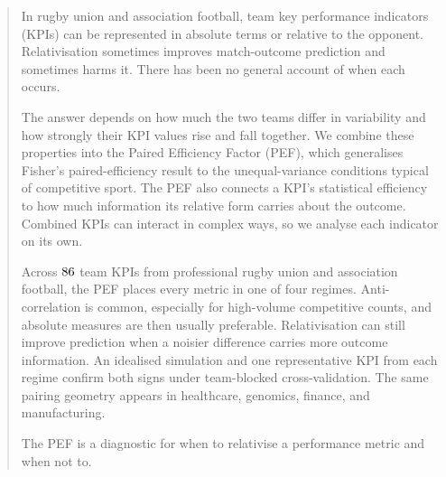 \begin{abstract}
In rugby union and association football, team key performance indicators (KPIs) can be represented in absolute terms or relative to the opponent. Relativisation sometimes improves match-outcome prediction and sometimes harms it. There has been no general account of when each occurs.

The answer depends on how much the two teams differ in variability and how strongly their KPI values rise and fall together. We combine these properties into the Paired Efficiency Factor (PEF), which generalises Fisher's paired-efficiency result to the unequal-variance conditions typical of competitive sport. The PEF also connects a KPI's statistical efficiency to how much information its relative form carries about the outcome. Combined KPIs can interact in complex ways, so we analyse each indicator on its own.

Across $\PEFtotalStudies$ team KPIs from professional rugby union and association football, the PEF places every metric in one of four regimes. Anti-correlation is common, especially for high-volume competitive counts, and absolute measures are then usually preferable. Relativisation can still improve prediction when a noisier difference carries more outcome information. An idealised simulation and one representative KPI from each regime confirm both signs under team-blocked cross-validation. The same pairing geometry appears in healthcare, genomics, finance, and manufacturing.

The PEF is a diagnostic for when to relativise a performance metric and when not to.
\end{abstract}
